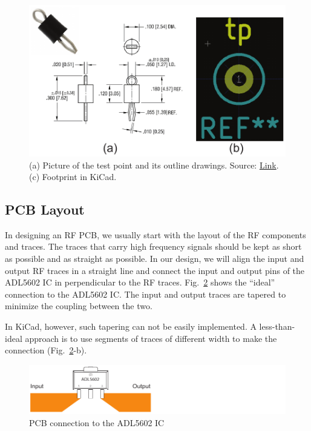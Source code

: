 \documentclass[12pt,letterpaper]{scrartcl}
\begin{document}
	\begin{figure}[ph]
		\centering
		\includegraphics[width=4.5in]{testpoint-footprint}
		\caption{(a) Picture of the test point and its outline drawings. Source: \href{http://www.digikey.com/product-detail/en/5001/5001K-ND/255327}{Link}. (c) Footprint in KiCad.}
		\label{fig:testpoint-footprint}
	\end{figure}
	
\subsection{PCB Layout}

In designing an RF PCB, we usually start with the layout of the RF components and traces. The traces that carry high frequency signals should be kept as short as possible and as straight as possible. In our design, we will align the input and output RF traces in a straight line and connect the input and output pins of the ADL5602 IC in perpendicular to the RF traces. Fig.~\ref{fig:adl5602-connection} shows the ``ideal'' connection to the ADL5602 IC. The input and output traces are tapered to minimize the coupling between the two. 

In KiCad, however, such tapering can not be easily implemented. A less-than-ideal approach is to use segments of traces of different width to make the connection (Fig.~\ref{fig:adl5602-connection}-b). 

\begin{figure}[ph]
	\centering
	\includegraphics{adl5602-connection}
	\caption{PCB connection to the ADL5602 IC}
	\label{fig:adl5602-connection}
\end{figure}
\end{document}
